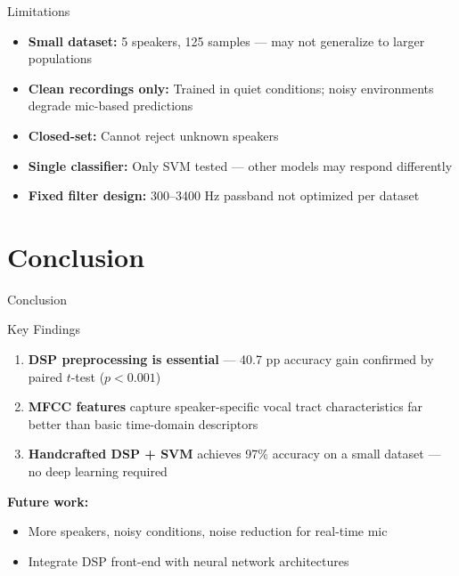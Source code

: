 \documentclass[aspectratio=169]{beamer}
\begin{document}
\begin{frame}{Limitations}
\begin{itemize}
    \item \textbf{Small dataset:} 5 speakers, 125 samples — may not generalize to larger populations
    \vspace{0.2cm}
    \item \textbf{Clean recordings only:} Trained in quiet conditions; noisy environments degrade mic-based predictions
    \vspace{0.2cm}
    \item \textbf{Closed-set:} Cannot reject unknown speakers
    \vspace{0.2cm}
    \item \textbf{Single classifier:} Only SVM tested — other models may respond differently
    \vspace{0.2cm}
    \item \textbf{Fixed filter design:} 300--3400 Hz passband not optimized per dataset
\end{itemize}
\end{frame}

\section{Conclusion}
\begin{frame}{Conclusion}
\begin{block}{Key Findings}
\begin{enumerate}
    \item \textbf{DSP preprocessing is essential} — 40.7 pp accuracy gain confirmed by paired $t$-test ($p < 0.001$)
    \item \textbf{MFCC features} capture speaker-specific vocal tract characteristics far better than basic time-domain descriptors
    \item \textbf{Handcrafted DSP + SVM} achieves 97\% accuracy on a small dataset — no deep learning required
\end{enumerate}
\end{block}

\vspace{0.3cm}
\textbf{Future work:}
\begin{itemize}
    \item More speakers, noisy conditions, noise reduction for real-time mic
    \item Integrate DSP front-end with neural network architectures
\end{itemize}
\end{frame}
\end{document}
